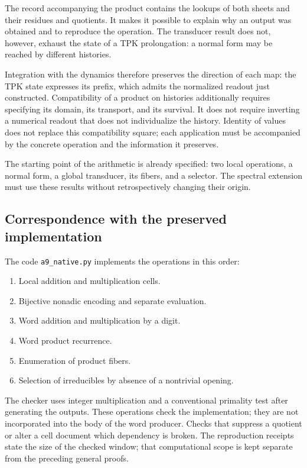 The record accompanying the product contains the lookups of both sheets and their residues and quotients. It makes it possible to explain why an output was obtained and to reproduce the operation. The transducer result does not, however, exhaust the state of a TPK prolongation: a normal form may be reached by different histories.

Integration with the dynamics therefore preserves the direction of each map: the TPK state expresses its prefix, which admits the normalized readout just constructed. Compatibility of a product on histories additionally requires specifying its domain, its transport, and its survival. It does not require inverting a numerical readout that does not individualize the history. Identity of values does not replace this compatibility square; each application must be accompanied by the concrete operation and the information it preserves.

The starting point of the arithmetic is already specified: two local operations, a normal form, a global transducer, its fibers, and a selector. The spectral extension must use these results without retrospectively changing their origin.

\subsection{Correspondence with the preserved implementation}
The code \texttt{a9\_\allowbreak{}native.\allowbreak{}py} implements the operations in this order:

\begin{enumerate}
\item Local addition and multiplication cells.
\item Bijective nonadic encoding and separate evaluation.
\item Word addition and multiplication by a digit.
\item Word product recurrence.
\item Enumeration of product fibers.
\item Selection of irreducibles by absence of a nontrivial opening.
\end{enumerate}
The checker uses integer multiplication and a conventional primality test after generating the outputs. These operations check the implementation; they are not incorporated into the body of the word producer. Checks that suppress a quotient or alter a cell document which dependency is broken. The reproduction receipts state the size of the checked window; that computational scope is kept separate from the preceding general proofs.
